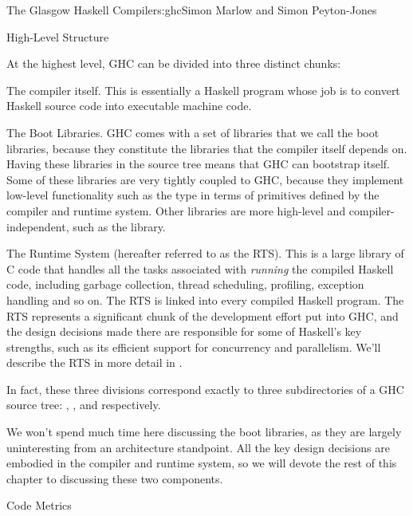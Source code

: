 \begin{aosachapter}{The Glasgow Haskell Compiler}{s:ghc}{Simon Marlow and Simon Peyton-Jones}
\begin{aosasect1}{High-Level Structure}

At the highest level, GHC can be divided into three distinct chunks:

\begin{aosaitemize}

\item The compiler itself.  This is essentially a Haskell program
  whose job is to convert Haskell source code into executable machine
  code.

\item The Boot Libraries.  GHC comes with a set of libraries that we
  call the boot libraries, because they constitute the libraries that
  the compiler itself depends on.  Having these libraries in the
  source tree means that GHC can bootstrap itself.  Some of these
  libraries are very tightly coupled to GHC, because they implement
  low-level functionality such as the  type in terms of
  primitives defined by the compiler and runtime system.  Other
  libraries are more high-level and compiler-independent, such as the
   library.

\item The Runtime System (hereafter referred to as the RTS).  This is
  a large library of C code that handles all the tasks associated with
  \emph{running} the compiled Haskell code, including garbage
  collection, thread scheduling, profiling, exception handling and so
  on.  The RTS is linked into every compiled Haskell program.  The RTS
  represents a significant chunk of the development effort put into
  GHC, and the design decisions made there are responsible for some of
  Haskell's key strengths, such as its efficient support for
  concurrency and parallelism.  We'll describe the RTS in more detail
  in .

\end{aosaitemize}

In fact, these three divisions correspond exactly to three
subdirectories of a GHC source tree: ,
, and  respectively.

We won't spend much time here discussing the boot libraries, as they
are largely uninteresting from an architecture standpoint.  All the
key design decisions are embodied in the compiler and runtime system,
so we will devote the rest of this chapter to discussing these two
components.

\begin{aosasect2}{Code Metrics}


\end{aosasect2}
\end{aosasect1}
\end{aosachapter}
